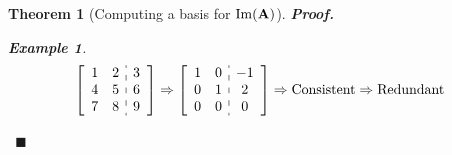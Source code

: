 \documentclass[12pt, a4paper]{article}
\newtheorem{thm}{Theorem}[subsection]
\newtheorem{eg}{Example}[subsection]
\newenvironment*{prf}{\par\indent\textbf{\textit{Proof. }}}{\hfill $\blacksquare$\par}
\def\IM{{\mathrm{Im}}}
\def\matrixA{\vb{A}}
\begin{document}
\begin{thm}[Computing a basis for $\IM(\matrixA)$]
\begin{prf}
\begin{eg}
			\[\left[\begin{array}{c:c}\begin{matrix}1&2\\4&5\\7&8\end{matrix}&\begin{matrix}3\\6\\9\end{matrix}\end{array}\right]\Rightarrow\left[\begin{array}{c:c}\begin{matrix}1&0\\0&1\\0&0\end{matrix}&\begin{matrix}-1\\2\\0\end{matrix}\end{array}\right]\Rightarrow\text{Consistent}\Rightarrow\text{Redundant}\]
		\end{eg}\
	\end{prf}
\end{thm}
\end{document}
